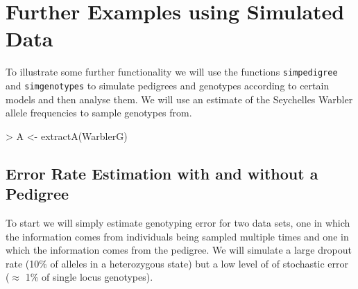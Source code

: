 \documentclass{article}
\begin{document}
\section{\large{Further Examples using Simulated Data}}

To illustrate some further functionality we will use the functions \texttt{simpedigree} and \texttt{simgenotypes} to simulate pedigrees and genotypes according to certain models and then analyse them. We will use an estimate of the Seychelles Warbler allele frequencies to sample genotypes from.

\begin{Schunk}
\begin{Sinput}
> A <- extractA(WarblerG)
\end{Sinput}
\end{Schunk}

\subsection{Error Rate Estimation with and without a Pedigree}
\label{Error-sec}

 To start we will simply estimate genotyping error for two data sets, one in which the information comes from individuals being sampled multiple times and one in which the information comes from the pedigree.  We will simulate a large dropout rate (10\% of alleles in a heterozygous state) but a low level of of stochastic error  ($\approx$ 1\% of single locus genotypes).
\end{document}
